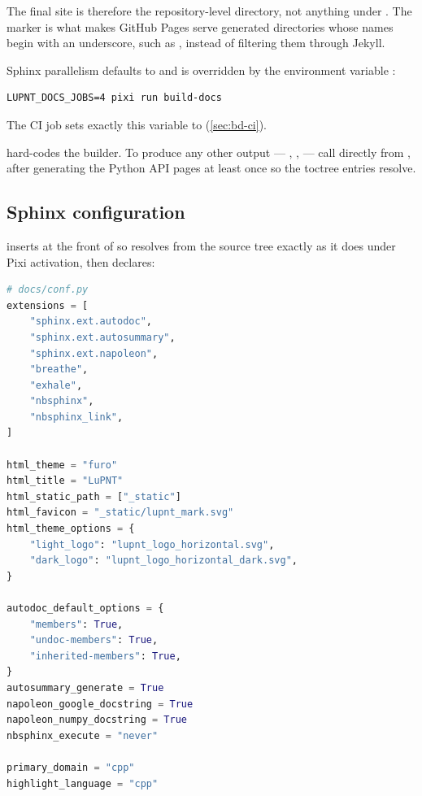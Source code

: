 The final site is therefore the repository-level  directory,
not anything under . The  marker is what makes
GitHub Pages serve generated directories whose names begin with an underscore,
such as , instead of filtering them through Jekyll.

Sphinx parallelism defaults to  and is
overridden by the environment variable :

\begin{lstlisting}[language=shell]
LUPNT_DOCS_JOBS=4 pixi run build-docs
\end{lstlisting}

The CI  job sets exactly this variable to 
(\cref{sec:bd-ci}).

\begin{lupntnote}
 hard-codes the  builder. To produce any other
output --- , ,  --- call
 directly from , after generating the Python API
pages at least once so the  toctree entries resolve.
\end{lupntnote}

\subsection{Sphinx configuration}
\label{sec:bd-conf}

 inserts  at the front of
 so  resolves from the source tree exactly
as it does under Pixi activation, then declares:

\begin{lstlisting}[language=py]
# docs/conf.py
extensions = [
    "sphinx.ext.autodoc",
    "sphinx.ext.autosummary",
    "sphinx.ext.napoleon",
    "breathe",
    "exhale",
    "nbsphinx",
    "nbsphinx_link",
]

html_theme = "furo"
html_title = "LuPNT"
html_static_path = ["_static"]
html_favicon = "_static/lupnt_mark.svg"
html_theme_options = {
    "light_logo": "lupnt_logo_horizontal.svg",
    "dark_logo": "lupnt_logo_horizontal_dark.svg",
}

autodoc_default_options = {
    "members": True,
    "undoc-members": True,
    "inherited-members": True,
}
autosummary_generate = True
napoleon_google_docstring = True
napoleon_numpy_docstring = True
nbsphinx_execute = "never"

primary_domain = "cpp"
highlight_language = "cpp"
\end{lstlisting}

